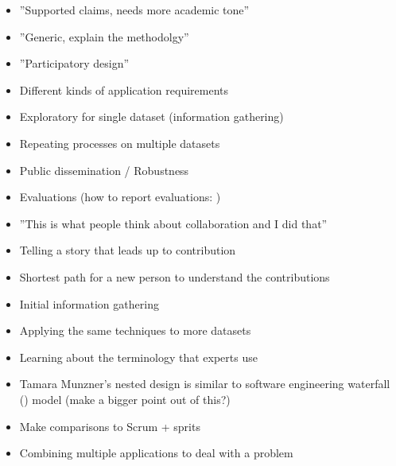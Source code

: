 \begin{itemize}
\item ''Supported claims, needs more academic tone''
\item ''Generic, explain the methodolgy''
\item ''Participatory design''
\item Different kinds of application requirements
\item Exploratory for single dataset (information gathering)
\item Repeating processes on multiple datasets
\item Public dissemination / Robustness
\item Evaluations \cite{plaisant2004challenge} (how to report evaluations: \cite{forsell2012guide})
\item ''This is what people think about collaboration and I did that''
\item Telling a story that leads up to contribution 
\item Shortest path for a new person to understand the contributions

\end{itemize}

\begin{itemize}
\item Initial information gathering
\item Applying the same techniques to more datasets
\item Learning about the terminology that experts use
\end{itemize}

\begin{itemize}
\item Tamara Munzner's nested design is similar to software engineering waterfall (\cite{royce1970managing, victor2003iterative}) model (make a bigger point out of this?)
\item Make comparisons to Scrum + sprits
\item Combining multiple applications to deal with a problem \cite{rungta2013manyvis}

\end{itemize}
